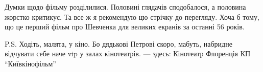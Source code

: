 Думки щодо фільму розділилися. Половині глядачів сподобалося, а половина
жорстко критикує. Та все ж я рекомендую цю стрічку до перегляду. Хоча б тому,
що це перший фільм про Шевченка для великих екранів за останні 56 років.

P.S. Ходіть, малята, у кіно. Бо дядькові Петрові скоро, мабуть, набридне
відчувати себе наче vip у залах кінотеатрів. --- здесь: Кінотеатр Флоренція КП
``Київкінофільм''
